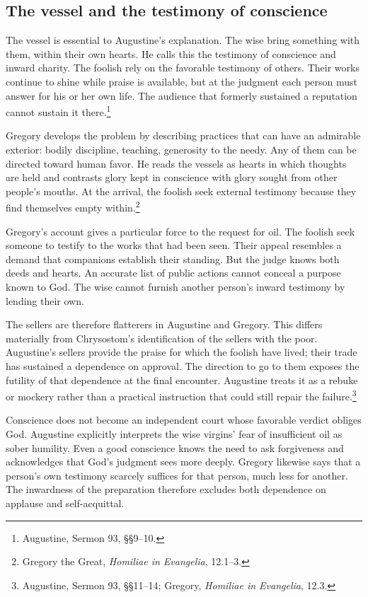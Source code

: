 \subsection{The vessel and the testimony of conscience}
The vessel is essential to Augustine's explanation. The wise bring something with them, within their own hearts. He calls this the testimony of conscience and inward charity. The foolish rely on the favorable testimony of others. Their works continue to shine while praise is available, but at the judgment each person must answer for his or her own life. The audience that formerly sustained a reputation cannot sustain it there.\footnote{Augustine, Sermon 93, §§9--10.}

Gregory develops the problem by describing practices that can have an admirable exterior: bodily discipline, teaching, generosity to the needy. Any of them can be directed toward human favor. He reads the vessels as hearts in which thoughts are held and contrasts glory kept in conscience with glory sought from other people's mouths. At the arrival, the foolish seek external testimony because they find themselves empty within.\footnote{Gregory the Great, \textit{Homiliae in Evangelia}, 12.1--3.}

Gregory's account gives a particular force to the request for oil. The foolish seek someone to testify to the works that had been seen. Their appeal resembles a demand that companions establish their standing. But the judge knows both deeds and hearts. An accurate list of public actions cannot conceal a purpose known to God. The wise cannot furnish another person's inward testimony by lending their own.

The sellers are therefore flatterers in Augustine and Gregory. This differs materially from Chrysostom's identification of the sellers with the poor. Augustine's sellers provide the praise for which the foolish have lived; their trade has sustained a dependence on approval. The direction to go to them exposes the futility of that dependence at the final encounter. Augustine treats it as a rebuke or mockery rather than a practical instruction that could still repair the failure.\footnote{Augustine, Sermon 93, §§11--14; Gregory, \textit{Homiliae in Evangelia}, 12.3.}

Conscience does not become an independent court whose favorable verdict obliges God. Augustine explicitly interprets the wise virgins' fear of insufficient oil as sober humility. Even a good conscience knows the need to ask forgiveness and acknowledges that God's judgment sees more deeply. Gregory likewise says that a person's own testimony scarcely suffices for that person, much less for another. The inwardness of the preparation therefore excludes both dependence on applause and self-acquittal.

